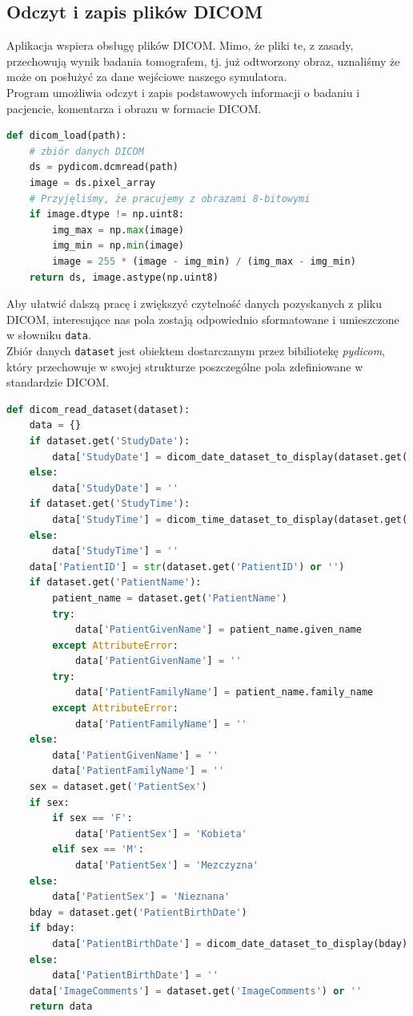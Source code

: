 \documentclass[a4paper]{article}
\begin{document}
\subsection{Odczyt i zapis plików DICOM}
Aplikacja wspiera obsługę plików DICOM. Mimo, że pliki te, z zasady, przechowują wynik badania tomografem, tj. już odtworzony obraz, uznaliśmy że może on posłużyć za dane wejściowe naszego symulatora.\\
Program umożliwia odczyt i zapis podstawowych informacji o badaniu i pacjencie, komentarza i obrazu w formacie DICOM.
\begin{lstlisting}[language=Python, caption=Wczytywanie plików DICOM, texcl=true]
def dicom_load(path):
    # zbiór danych DICOM
    ds = pydicom.dcmread(path)
    image = ds.pixel_array
    # Przyjęliśmy, że pracujemy z obrazami 8-bitowymi
    if image.dtype != np.uint8:
        img_max = np.max(image)
        img_min = np.min(image)
        image = 255 * (image - img_min) / (img_max - img_min)
    return ds, image.astype(np.uint8)
\end{lstlisting}
Aby ułatwić dalszą pracę i zwiększyć czytelność danych pozyskanych z pliku DICOM, interesujące nas pola zostają odpowiednio sformatowane i umieszczone w słowniku \texttt{data}. \\
Zbiór danych \texttt{dataset} jest obiektem dostarczanym przez bibiliotekę \textit{pydicom}, który przechowuje w swojej strukturze poszczególne pola zdefiniowane w standardzie DICOM.
\begin{lstlisting}[language=Python, caption=Odczyt interesujących wartości ze zbioru danych DICOM, texcl=true]
def dicom_read_dataset(dataset):
    data = {}
    if dataset.get('StudyDate'):
        data['StudyDate'] = dicom_date_dataset_to_display(dataset.get('StudyDate'))
    else:
        data['StudyDate'] = ''
    if dataset.get('StudyTime'):
        data['StudyTime'] = dicom_time_dataset_to_display(dataset.get('StudyTime'))
    else:
        data['StudyTime'] = ''
    data['PatientID'] = str(dataset.get('PatientID') or '')
    if dataset.get('PatientName'):
        patient_name = dataset.get('PatientName')
        try:
            data['PatientGivenName'] = patient_name.given_name
        except AttributeError:
            data['PatientGivenName'] = ''
        try:
            data['PatientFamilyName'] = patient_name.family_name
        except AttributeError:
            data['PatientFamilyName'] = ''
    else:
        data['PatientGivenName'] = ''
        data['PatientFamilyName'] = ''
    sex = dataset.get('PatientSex')
    if sex:
        if sex == 'F':
            data['PatientSex'] = 'Kobieta'
        elif sex == 'M':
            data['PatientSex'] = 'Mezczyzna'
    else:
        data['PatientSex'] = 'Nieznana'
    bday = dataset.get('PatientBirthDate')
    if bday:
        data['PatientBirthDate'] = dicom_date_dataset_to_display(bday)
    else:
        data['PatientBirthDate'] = ''
    data['ImageComments'] = dataset.get('ImageComments') or ''
    return data
\end{lstlisting}
\end{document}
